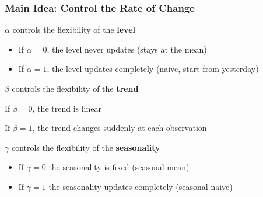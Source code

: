 \documentclass{beamer}
\newenvironment{wideitemize}{\itemize\addtolength{\itemsep}{10pt}}{\enditemize}
\begin{document}
\begin{frame}
  \frametitle{Main Idea: Control the Rate of Change}

  \begin{wideitemize}
  \item $\alpha$ controls the flexibility of the \textbf{level}
    \begin{itemize}
    \item If $\alpha = 0$, the level never updates (stays at the mean)
    \item If $\alpha = 1$, the level updates completely (naive, start from yesterday)
    \end{itemize}
  \item $\beta$ controls the flexibility of the \textbf{trend}
    \item If $\beta = 0$, the trend is linear
    \item If $\beta = 1$, the trend changes suddenly at each observation
    
    \item $\gamma$ controls the flexibility of the \textbf{seasonality}
      \begin{itemize}
      \item If $\gamma = 0$ the seasonality is fixed (seasonal mean)
      \item If $\gamma = 1$ the seasonality updates completely (seasonal naive)        
      \end{itemize}
  \end{wideitemize}
  
\end{frame}
\end{document}
